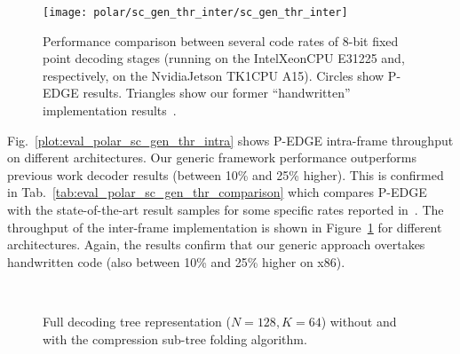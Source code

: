 \begin{figure}
  \texttt{[image: polar/sc\_gen\_thr\_inter/sc\_gen\_thr\_inter]}
  \caption{Performance comparison between several code rates of 8-bit fixed
    point decoding stages (running on the Intel\R Xeon\TM CPU E31225 and,
    respectively, on the Nvidia\R Jetson TK1\TM CPU A15). Circles show P-EDGE
    results. Triangles show our former ``handwritten'' implementation
    results~\cite{LeGal2015a}.}
  \label{plot:eval_polar_sc_gen_thr_inter}
\end{figure}

Fig.~\ref{plot:eval_polar_sc_gen_thr_intra} shows P-EDGE intra-frame throughput
on different architectures. Our generic framework performance outperforms
previous work decoder results (between 10\% and 25\% higher). This is confirmed
in Tab.~\ref{tab:eval_polar_sc_gen_thr_comparison} which compares P-EDGE with
the state-of-the-art result samples for some specific rates reported
in~\cite{Sarkis2014}. The throughput of the inter-frame implementation is shown
in Figure~\ref{plot:eval_polar_sc_gen_thr_inter} for different architectures.
Again, the results confirm that our generic approach overtakes handwritten code
(also between 10\% and 25\% higher on x86).

\begin{figure}
  \centering
  \\
  \caption{Full decoding tree representation ($N = 128, K = 64$) without and
    with the compression sub-tree folding algorithm.}
  \label{fig:eval_polar_sc_gen_compression}
\end{figure}

